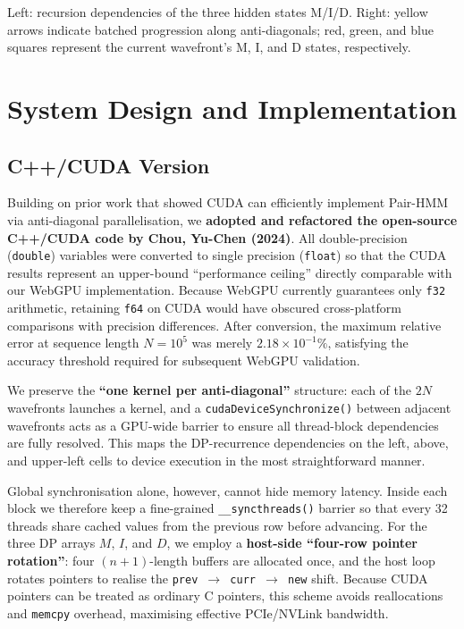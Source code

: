 \documentclass[12pt]{report}
\begin{document}
Left: recursion dependencies of the three hidden states M/I/D. Right: yellow arrows indicate batched progression along anti-diagonals; red, green, and blue squares represent the current wavefront’s M, I, and D states, respectively.

\section{System Design and Implementation}
\subsection{C++/CUDA Version}
Building on prior work that showed CUDA can efficiently implement Pair-HMM via anti-diagonal parallelisation, we \textbf{adopted and refactored the open-source C++/CUDA code by Chou, Yu-Chen (2024)}. All double-precision (\texttt{double}) variables were converted to single precision (\texttt{float}) so that the CUDA results represent an upper-bound ``performance ceiling'' directly comparable with our WebGPU implementation. Because WebGPU currently guarantees only \texttt{f32} arithmetic, retaining \texttt{f64} on CUDA would have obscured cross-platform comparisons with precision differences. After conversion, the maximum relative error at sequence length $N = 10^5$ was merely $2.18 \times 10^{-1}\%$, satisfying the accuracy threshold required for subsequent WebGPU validation.

We preserve the \textbf{``one kernel per anti-diagonal''} structure: each of the $2N$ wavefronts launches a kernel, and a \texttt{cudaDeviceSynchronize()} between adjacent wavefronts acts as a GPU-wide barrier to ensure all thread-block dependencies are fully resolved. This maps the DP-recurrence dependencies on the left, above, and upper-left cells to device execution in the most straightforward manner.

Global synchronisation alone, however, cannot hide memory latency. Inside each block we therefore keep a fine-grained \texttt{\_\_syncthreads()} barrier so that every 32 threads share cached values from the previous row before advancing. For the three DP arrays $M$, $I$, and $D$, we employ a \textbf{host-side ``four-row pointer rotation''}: four $(n+1)$-length buffers are allocated once, and the host loop rotates pointers to realise the \texttt{prev $\rightarrow$ curr $\rightarrow$ new} shift. Because CUDA pointers can be treated as ordinary C pointers, this scheme avoids reallocations and \texttt{memcpy} overhead, maximising effective PCIe/NVLink bandwidth.
\end{document}
